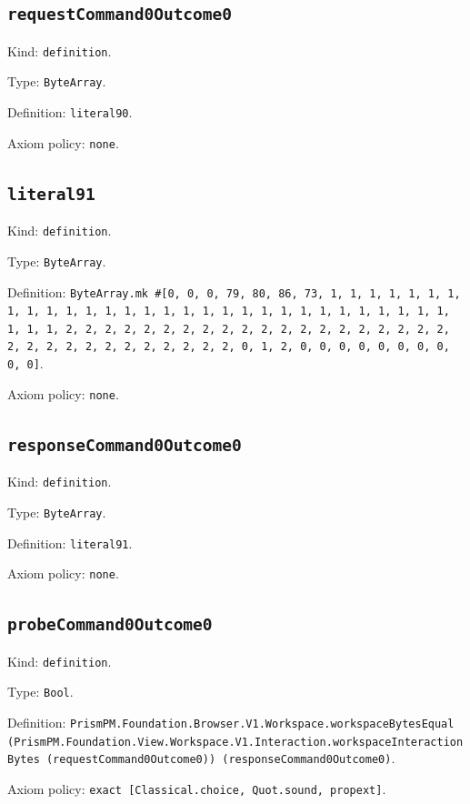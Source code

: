 \documentclass[11pt]{article}
\begin{document}
\subsection*{\texttt{requestCommand0Outcome0}}
\noindent Kind: \texttt{definition}.\par
\noindent Type: \texttt{ByteArray}.\par
\noindent Definition: \texttt{literal90}.\par
\noindent Axiom policy: \texttt{none}.\par
\subsection*{\texttt{literal91}}
\noindent Kind: \texttt{definition}.\par
\noindent Type: \texttt{ByteArray}.\par
\noindent Definition: \texttt{ByteArray.mk \#[0, 0, 0, 79, 80, 86, 73, 1, 1, 1, 1, 1, 1, 1, 1, 1, 1, 1, 1, 1, 1, 1, 1, 1, 1, 1, 1, 1, 1, 1, 1, 1, 1, 1, 1, 1, 1, 1, 1, 1, 2, 2, 2, 2, 2, 2, 2, 2, 2, 2, 2, 2, 2, 2, 2, 2, 2, 2, 2, 2, 2, 2, 2, 2, 2, 2, 2, 2, 2, 2, 2, 2, 0, 1, 2, 0, 0, 0, 0, 0, 0, 0, 0, 0, 0]}.\par
\noindent Axiom policy: \texttt{none}.\par
\subsection*{\texttt{responseCommand0Outcome0}}
\noindent Kind: \texttt{definition}.\par
\noindent Type: \texttt{ByteArray}.\par
\noindent Definition: \texttt{literal91}.\par
\noindent Axiom policy: \texttt{none}.\par
\subsection*{\texttt{probeCommand0Outcome0}}
\noindent Kind: \texttt{definition}.\par
\noindent Type: \texttt{Bool}.\par
\noindent Definition: \texttt{PrismPM.Foundation.Browser.V1.Workspace.workspaceBytesEqual (PrismPM.Foundation.View.Workspace.V1.Interaction.workspaceInteractionBytes (requestCommand0Outcome0)) (responseCommand0Outcome0)}.\par
\noindent Axiom policy: \texttt{exact [Classical.choice, Quot.sound, propext]}.\par
\end{document}
